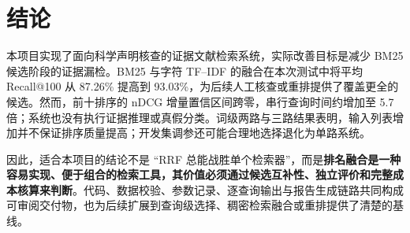 \documentclass[sigconf,nonacm]{acmart}
\begin{document}
\section{结论}
本项目实现了面向科学声明核查的证据文献检索系统，实际改善目标是减少 BM25 候选阶段的证据漏检。BM25 与字符 TF--IDF 的融合在本次测试中将平均 Recall@100 从 87.26\% 提高到 93.03\%，为后续人工核查或重排提供了覆盖更全的候选。然而，前十排序的 nDCG 增量置信区间跨零，串行查询时间约增加至 5.7 倍；系统也没有执行证据推理或真假分类。词级两路与三路结果表明，输入列表增加并不保证排序质量提高；开发集调参还可能合理地选择退化为单路系统。

因此，适合本项目的结论不是 ``RRF 总能战胜单个检索器''，而是\textbf{排名融合是一种容易实现、便于组合的检索工具，其价值必须通过候选互补性、独立评价和完整成本核算来判断}。代码、数据校验、参数记录、逐查询输出与报告生成链路共同构成可审阅交付物，也为后续扩展到查询级选择、稠密检索融合或重排提供了清楚的基线。



\end{document}
